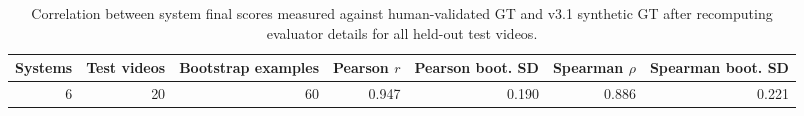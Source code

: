 \begin{table}
\caption{Correlation between system final scores measured against human-validated GT and v3.1 synthetic GT after recomputing evaluator details for all held-out test videos.}
\label{tab:cvs-act-recomputed-test20-synth-human-correlation}
\begin{tabular}{rrrrrrr}
\toprule
Systems & Test videos & Bootstrap examples & Pearson $r$ & Pearson boot. SD & Spearman $\rho$ & Spearman boot. SD \\
\midrule
6 & 20 & 60 & 0.947 & 0.190 & 0.886 & 0.221 \\
\bottomrule
\end{tabular}
\end{table}

